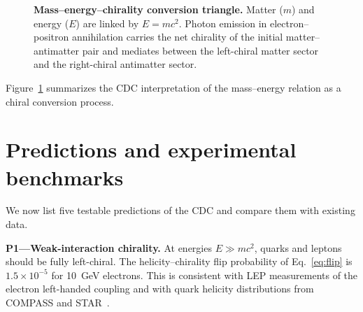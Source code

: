 \documentclass[11pt,a4paper]{article}
\begin{document}
\begin{figure}[htbp]
\centering
{}
\caption{\textbf{Mass--energy--chirality conversion triangle.} Matter ($m$) and energy ($E$) are linked by $E=mc^2$. Photon emission in electron--positron annihilation carries the net chirality of the initial matter--antimatter pair and mediates between the left-chiral matter sector and the right-chiral antimatter sector.}
\label{fig:emc2_triangle}
\end{figure}

Figure~\ref{fig:emc2_triangle} summarizes the CDC interpretation of the mass--energy relation as a chiral conversion process.

\section*{Predictions and experimental benchmarks}

We now list five testable predictions of the CDC and compare them with existing data.

\textbf{P1---Weak-interaction chirality.} At energies $E\gg mc^2$, quarks and leptons should be fully left-chiral. The helicity--chirality flip probability of Eq.~\eqref{eq:flip} is $1.5\times10^{-5}$ for 10~GeV electrons. This is consistent with LEP measurements of the electron left-handed coupling and with quark helicity distributions from COMPASS and STAR~\cite{lep2006,compass2010,star2015}.
\end{document}
